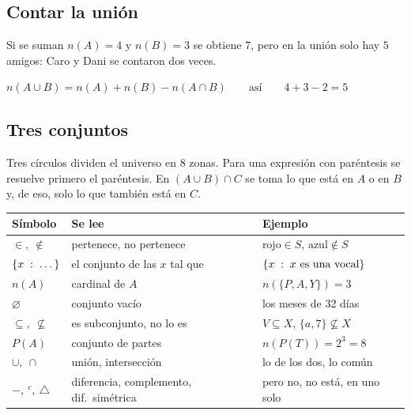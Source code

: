 \documentclass[11pt,a4paper]{article}
\begin{document}
\subsection{Contar la unión}
Si se suman $n(A)=4$ y $n(B)=3$ se obtiene $7$, pero en la unión solo hay $5$ amigos: Caro y Dani se contaron dos veces.
\begin{clavebox}
$\displaystyle n(A\cup B)=n(A)+n(B)-n(A\cap B)\qquad\text{así}\qquad 4+3-2=5$
\end{clavebox}

\subsection{Tres conjuntos}
\begin{minipage}[c]{0.55\linewidth}
Tres círculos dividen el universo en $8$ zonas. Para una expresión con paréntesis se resuelve primero el
paréntesis. En $(A\cup B)\cap C$ se toma lo que está en $A$ o en $B$ y, de eso, solo lo que también está en $C$.
\end{minipage}\hfill
\begin{minipage}[c]{0.4\linewidth}\centering
{}
\end{minipage}

\repaso
\begin{center}
\begin{tabularx}{\linewidth}{@{}>{\centering\arraybackslash}p{16mm} l L@{}}
\toprule
Símbolo & Se lee & Ejemplo\\ \midrule
$\in,\ \notin$ & pertenece, no pertenece & $\text{rojo}\in S$, $\text{azul}\notin S$\\
$\{x\;:\; \dots\}$ & el conjunto de las $x$ tal que & $\{x\;:\; x\text{ es una vocal}\}$\\
$n(A)$ & cardinal de $A$ & $n(\{P,A,Y\})=3$\\
$\varnothing$ & conjunto vacío & los meses de 32 días\\
$\subseteq,\ \not\subseteq$ & es subconjunto, no lo es & $V\subseteq X$, $\{a,7\}\not\subseteq X$\\
$P(A)$ & conjunto de partes & $n(P(T))=2^3=8$\\
$\cup,\ \cap$ & unión, intersección & lo de los dos, lo común\\
$-,\ ^{c},\ \triangle$ & diferencia, complemento, dif.\ simétrica & pero no, no está, en uno solo\\
\bottomrule
\end{tabularx}
\end{center}
\end{document}
